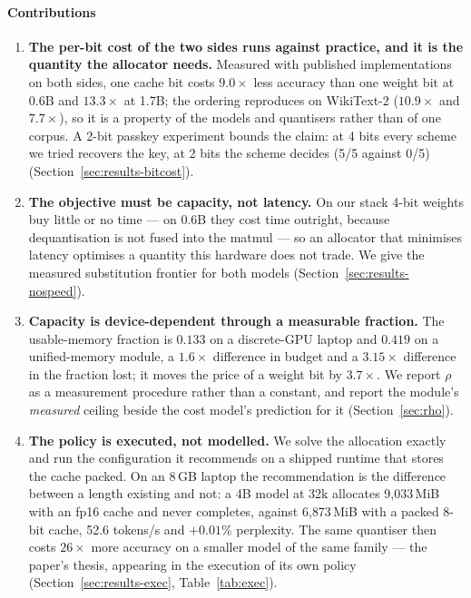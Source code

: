 \documentclass[5p]{elsarticle}
\newcommand{\rhoSym}{\rho}
\begin{document}
\paragraph*{Contributions}
\begin{enumerate}
\item \textbf{The per-bit cost of the two sides runs against practice, and it is
      the quantity the allocator needs.} Measured with published implementations
      on both sides, one cache bit costs $9.0\times$ less accuracy than one
      weight bit at 0.6B and $13.3\times$ at 1.7B; the ordering reproduces on
      WikiText-2 ($10.9\times$ and $7.7\times$), so it is a property of the
      models and quantisers rather than of one corpus. A 2-bit passkey
      experiment bounds the claim: at 4 bits every scheme we tried recovers the
      key, at 2 bits the scheme decides (5/5 against 0/5)
      (Section~\ref{sec:results-bitcost}).

\item \textbf{The objective must be capacity, not latency.} On our stack 4-bit
      weights buy little or no time --- on 0.6B they cost time outright, because
      dequantisation is not fused into the matmul --- so an allocator that
      minimises latency optimises a quantity this hardware does not trade. We
      give the measured substitution frontier for both models
      (Section~\ref{sec:results-nospeed}).

\item \textbf{Capacity is device-dependent through a measurable fraction.} The
      usable-memory fraction is $0.133$ on a discrete-GPU laptop and $0.419$ on
      a unified-memory module, a $1.6\times$ difference in budget and a
      $3.15\times$ difference in the fraction lost; it moves the price of a
      weight bit by $3.7\times$. We report $\rhoSym$ as a measurement procedure
      rather than a constant, and report the module's \emph{measured} ceiling
      beside the cost model's prediction for it (Section~\ref{sec:rho}).

\item \textbf{The policy is executed, not modelled.} We solve the allocation
      exactly and run the configuration it recommends on a shipped runtime that
      stores the cache packed. On an 8\,GB laptop the recommendation is the
      difference between a length existing and not: a 4B model at 32k allocates
      9{,}033\,MiB with an fp16 cache and never completes, against 6{,}873\,MiB
      with a packed 8-bit cache, 52.6 tokens/s and $+0.01\%$ perplexity. The same
      quantiser then costs $26\times$ more accuracy on a smaller model of the same
      family --- the paper's thesis, appearing in the execution of its own policy
      (Section~\ref{sec:results-exec}, Table~\ref{tab:exec}).


\end{enumerate}
\end{document}
